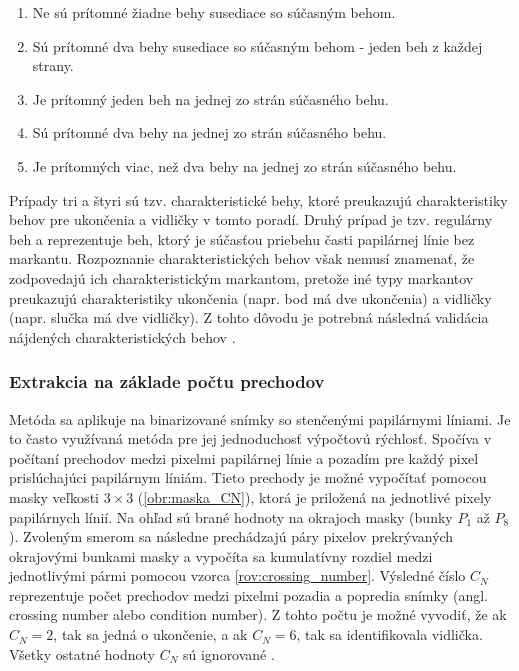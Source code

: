   \begin{enumerate}
    \item Ne sú prítomné žiadne behy susediace so súčasným behom.
    \item Sú prítomné dva behy susediace so súčasným behom - jeden beh z každej strany.
    \item Je prítomný jeden beh na jednej zo strán súčasného behu.
    \item Sú prítomné dva behy na jednej zo strán súčasného behu.
    \item Je prítomných viac, než dva behy na jednej zo strán súčasného behu.
  \end{enumerate}
  Prípady tri a štyri sú tzv. charakteristické behy, ktoré preukazujú charakteristiky behov pre ukončenia a vidličky v tomto poradí. Druhý prípad je
  tzv. regulárny beh a reprezentuje beh, ktorý je súčasťou priebehu časti papilárnej línie bez markantu. Rozpoznanie charakteristických behov však
  nemusí znamenať, že zodpovedajú ich charakteristickým markantom, pretože iné typy markantov preukazujú charakteristiky ukončenia (napr. bod má dve ukončenia)
  a vidličky (napr. slučka má dve vidličky). Z tohto dôvodu je potrebná následná validácia nájdených charakteristických behov \cite{bansal2011minutiae}.

  \subsubsection*{Extrakcia na základe počtu prechodov}
  Metóda sa aplikuje na binarizované snímky so stenčenými papilárnymi líniami. Je to často využívaná metóda pre jej jednoduchosť výpočtovú rýchlosť.
  Spočíva v počítaní prechodov medzi pixelmi papilárnej línie a pozadím pre každý pixel prislúchajúci papilárnym líniám. Tieto prechody je možné vypočítať
  pomocou masky veľkosti $3\times{}3$ (\ref{obr:maska_CN}), ktorá je priložená na jednotlivé pixely papilárnych línií. Na ohľad sú brané
  hodnoty na okrajoch masky (bunky $P_1$ až $P_8$). Zvoleným smerom sa následne prechádzajú páry pixelov prekrývaných okrajovými bunkami masky a vypočíta
  sa kumulatívny rozdiel medzi jednotlivými pármi pomocou vzorca \ref{rov:crossing_number}. Výsledné číslo $C_N$ reprezentuje počet prechodov medzi
  pixelmi pozadia a popredia snímky (angl. crossing number alebo condition number). Z tohto počtu je možné vyvodiť, že ak $C_N = 2$, tak sa jedná o ukončenie,
  a ak $C_N = 6$, tak sa identifikovala vidlička. Všetky ostatné hodnoty $C_N$ sú ignorované \cite{amengual1997minutiae_extraction}.

